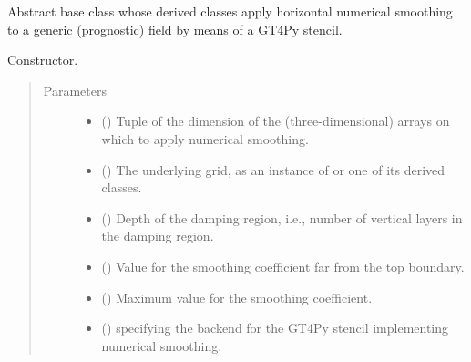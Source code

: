 \documentclass[letterpaper,10pt,english]{sphinxmanual}
\begin{document}
\begin{fulllineitems}
\label{\detokenize{api:dycore.horizontal_smoothing.HorizontalSmoothing}}
Abstract base class whose derived classes apply horizontal numerical smoothing to a generic (prognostic)
field by means of a GT4Py stencil.

\begin{fulllineitems}
\label{\detokenize{api:dycore.horizontal_smoothing.HorizontalSmoothing.__init__}}
Constructor.
\begin{quote}\begin{description}
\item[{Parameters}] \leavevmode\begin{itemize}
\item {} 
 () \textendash{} Tuple of the dimension of the (three-dimensional) arrays on which to apply numerical smoothing.

\item {} 
 () \textendash{} The underlying grid, as an instance of {\hyperref[\detokenize{api:grids.grid_xyz.GridXYZ}]{}} or one of its derived classes.

\item {} 
 () \textendash{} Depth of the damping region, i.e., number of vertical layers in the damping region.

\item {} 
 () \textendash{} Value for the smoothing coefficient far from the top boundary.

\item {} 
 () \textendash{} Maximum value for the smoothing coefficient.

\item {} 
 () \textendash{}  specifying the backend for the GT4Py stencil implementing numerical smoothing.


\end{itemize}
\end{description}
\end{quote}
\end{fulllineitems}
\end{fulllineitems}
\end{document}
